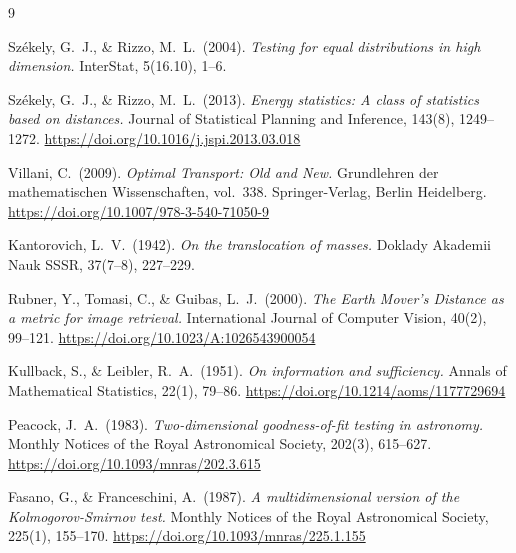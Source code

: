 \documentclass[11pt,a4paper]{article}
\begin{document}
\newpage
\begin{thebibliography}{9}

Székely, G.\ J., \& Rizzo, M.\ L.\ (2004).
\emph{Testing for equal distributions in high dimension.}
InterStat, 5(16.10), 1--6.

Székely, G.\ J., \& Rizzo, M.\ L.\ (2013).
\emph{Energy statistics: A class of statistics based on distances.}
Journal of Statistical Planning and Inference, 143(8), 1249--1272.
\url{https://doi.org/10.1016/j.jspi.2013.03.018}

Villani, C.\ (2009).
\emph{Optimal Transport: Old and New.}
Grundlehren der mathematischen Wissenschaften, vol.\ 338.
Springer-Verlag, Berlin Heidelberg.
\url{https://doi.org/10.1007/978-3-540-71050-9}

Kantorovich, L.\ V.\ (1942).
\emph{On the translocation of masses.}
Doklady Akademii Nauk SSSR, 37(7--8), 227--229.

Rubner, Y., Tomasi, C., \& Guibas, L.\ J.\ (2000).
\emph{The Earth Mover's Distance as a metric for image retrieval.}
International Journal of Computer Vision, 40(2), 99--121.
\url{https://doi.org/10.1023/A:1026543900054}

Kullback, S., \& Leibler, R.\ A.\ (1951).
\emph{On information and sufficiency.}
Annals of Mathematical Statistics, 22(1), 79--86.
\url{https://doi.org/10.1214/aoms/1177729694}

Peacock, J.\ A.\ (1983).
\emph{Two-dimensional goodness-of-fit testing in astronomy.}
Monthly Notices of the Royal Astronomical Society, 202(3), 615--627.
\url{https://doi.org/10.1093/mnras/202.3.615}

Fasano, G., \& Franceschini, A.\ (1987).
\emph{A multidimensional version of the Kolmogorov-Smirnov test.}
Monthly Notices of the Royal Astronomical Society, 225(1), 155--170.
\url{https://doi.org/10.1093/mnras/225.1.155}

\end{thebibliography}
\end{document}

